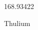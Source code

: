 \documentclass[12pt]{article}
\begin{document}
\hfill{}
\vfill
\begin{center}
  {\fontsize{50}{60}
  }

  \vspace{1em}

  168.93422

Thulium
\end{center}
\vfill
\end{document}
